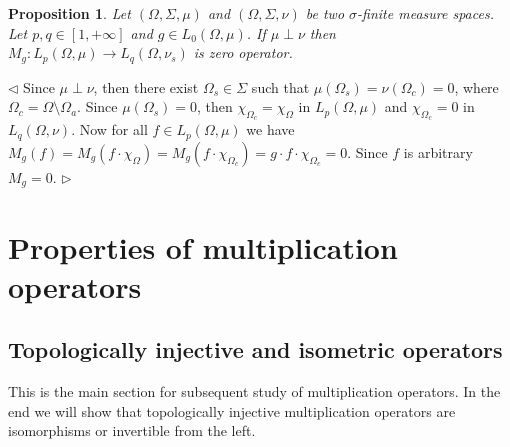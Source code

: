 \documentclass[12pt]{article}
\newtheorem{proposition}[theorem]{Proposition}
\newenvironment{proof}{\par $\triangleleft$}{$\triangleright$}
\begin{document}
\begin{proposition}\label{MultOpCharacBtwnTwoSingMeasSp} Let
    $(\Omega,\Sigma,\mu)$ and $(\Omega,\Sigma,\nu)$ be two $\sigma$-finite
    measure spaces. Let $p,q\in[1,+\infty]$ and $g\in L_0(\Omega,\mu)$. If
    $\mu\perp\nu$ then $M_g:L_p(\Omega,\mu)\to L_q(\Omega,\nu_s)$ is zero
    operator.
\end{proposition}
\begin{proof} Since $\mu\perp\nu$, then there exist $\Omega_s\in\Sigma$ such
    that $\mu(\Omega_s)=\nu(\Omega_c)=0$, where
    $\Omega_c=\Omega\setminus\Omega_a$. Since $\mu(\Omega_s)=0$, then
    $\chi_{\Omega_c}=\chi_{\Omega}$ in $L_p(\Omega,\mu)$ and $\chi_{\Omega_c}=0$
    in $L_q(\Omega,\nu)$. Now for all $f\in L_p(\Omega,\mu)$ we have
    $M_g(f)=M_g(f\cdot \chi_{\Omega})=M_g(f\cdot \chi_{\Omega_c})=g\cdot
        f\cdot\chi_{\Omega_c}=0$. Since $f$ is arbitrary $M_g=0$.
\end{proof}




\section{Properties of multiplication operators}


\subsection{Topologically injective and isometric operators}

This is the main section for subsequent study of multiplication operators. In
the end we will show that topologically injective multiplication operators are
isomorphisms or invertible from the left.
\end{document}

